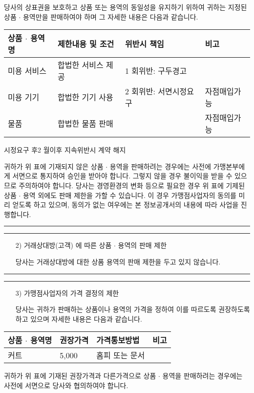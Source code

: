 \documentclass[a5paper,10pt]{oblivoir}
\newcommand\crule[3][black]{\textcolor{#1}{\rule{#2}{#3}}}
\begin{document}
\begin{enumerate}
\begin{enumerate}
 당사의 상표권을 보호하고 상품 또는 용역의 동일성을 유지하기 위하여 귀하는 지정된 상품 $\cdot$ 용역만을 판매하여야 하며 그 자세한 내용은 다음과 같습니다.
\end{enumerate}
\begin{center}
\begin{tiny}
\begin{tabu}{|X[-1]|X|X|X[-1]|}\hline
 상품 $\cdot$ 용역명& 제한내용 및 조건& 위반시 책임&비고\\\hline
미용 서비스& 합법한 서비스 제공& 1 회위반: 구두경고&\\
미용 기기& 합법한 기기 사용&2 회위반: 서면시정요구& 자점매입가능\\
 물품& 합법한 물품 판매&& 자점매입가능\\\hline
\end{tabu}
 시정요구 후2 월이후 지속위반시 계약 해지
\end{tiny}
\end{center}
 귀하가 위 표에 기재되지 않은 상품 $\cdot$ 용역을 판매하려는 경우에는 사전에 가맹본부에게 서면으로 통지하여 승인을 받아야 합니다.
 그렇지 않을 경우 불이익을 받을 수 있으므로 주의하여야 합니다. 당사는 경영환경의 변화 등으로 필요한 경우 위 표에 기제된 상품 $\cdot$ 용역 외에도 판매 제한을 가할 수 있습니다.  이 경우 가맹점사업자의 동의를 미리 얻도록 하고 있으며, 동의가 없는 여우에는 본 정보공개서의 내용에 따라 사업을 진행합니다.

\newpage
\begin{center}
\crule[red]{4cm}{0.1cm} \crule[blue]{4cm}{0.1cm}
\end{center}

\begin{enumerate}
\item[2)] 거래상대방(고객) 에 따른 상품 $\cdot$ 용역의 판매 제한

 당사는 거래상대방에 대한 상품 용역의 판매 제한을 두고 있지 않습니다.
\end{enumerate}

\newpage
\begin{center}
\crule[red]{4cm}{0.1cm} \crule[blue]{4cm}{0.1cm}
\end{center}

\begin{enumerate}
\item[3)] 가맹점사업자의 가격 결정의 제한

 당사는 귀하가 판매하는 상품이나 용역의 가격을 정하여 이를 따르도록 권장하도록 하고 있으며 자세한 내용은 다음과 같습니다.
\end{enumerate}
\begin{center}
\begin{tiny}
\begin{tabu}{|X[c]|X[c]|X[c]|X[c]|}\hline
  상품 $\cdot$ 용역명&권장가격&가격통보방법&비고\\\hline
 커트&5,000& 홈피 또는 문서&\\\hline
\end{tabu}
\end{tiny}
\end{center}
 귀하가 위 표에 기재된 권장가격과  다른가격으로 상품 $\cdot$ 용역을 판매하려는 경우에는 사전에 서면으로 당사와 협의하여야 합니다.


\end{enumerate}
\end{document}
